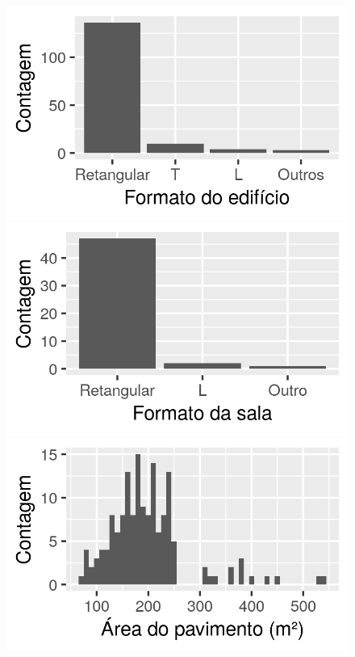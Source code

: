 \documentclass[brazil,hardcopy,openany,a4paper]{ufscthesis}
\begin{document}
\begin{figure}[h]
\begin{minipage}{.5\textwidth}
		\end{minipage}
		\centering
		\begin{minipage}{.5\textwidth}
			\centering
			\includegraphics[width=\linewidth]{img/hist_formato.png}
		\end{minipage}%
		\begin{minipage}{.5\textwidth}
			\centering
			\includegraphics[width=\linewidth]{img/hist_formato_sala.png}
		\end{minipage}
		\centering
		\begin{minipage}{.5\textwidth}
			\centering
			\includegraphics[width=\linewidth]{img/hist_area_edificio.png}

\end{minipage}
\end{figure}
\end{document}

